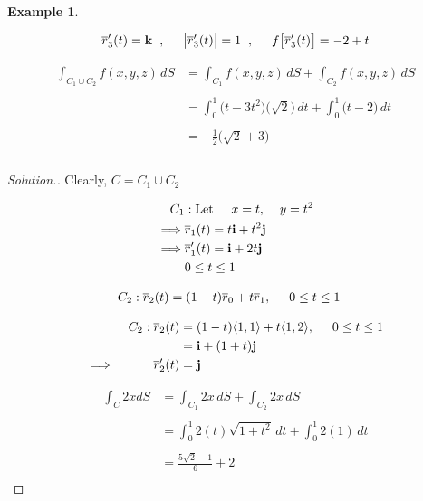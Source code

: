 \documentclass[11pt,a4paper]{article}
\theoremstyle{definition}
\newtheorem{exa}[thm]{Example}
\newenvironment{solution}
  {\renewcommand{\qedsymbol}{}\begin{proof}[\textit{Solution}.]}
  {\end{proof}}
\begin{document}
\begin{exa}
\begin{enumerate}
$$\overline{r}'_3(t) = \textbf{k}\hspace{0.2cm},\hspace{0.5cm} \begin{vmatrix}
\overline{r}'_3(t)\\
\end{vmatrix}  = 1\hspace{0.2cm},\hspace{0.5cm} f\big[\overline{r}'_3(t)\big] =-2 +t$$

\begin{align*}
\int_{C_1\cup C_2}f(x,y,z)\,dS & = \int_{C_1}f(x,y,z)\,dS + \int_{C_2}f(x,y,z)\,dS\\\\
& = \int^1_0 \big(t-3t^2\big)\big(\sqrt{2}\big)\,dt + \int^1_0 \big(t-2\big)\,dt\\\\
& = -\frac{1}{2}\big(\sqrt{2}+3\big)\\\\
\end{align*}
\end{enumerate}
\end{exa}

\begin{solution}
Clearly, $C = C_1 \cup C_2$

\begin{align*}
C_1 & : \text{Let}\hspace{0.5cm} x = t,\hspace{0.4cm} y = t^2\\
\implies & \overline{r}_1(t) = t\textbf{i} + t^2\textbf{j}\\
\implies & \overline{r}_1'(t) = \textbf{i} + 2t\textbf{j}\\
& 0\leq t \leq 1
\end{align*}

\begin{align*}
C_2 & : \overline{r}_2(t) = (1-t)\overline{r}_0 + t\overline{r}_1,\hspace{0.5cm} 0\leq t\leq 1
\end{align*}

\begin{align*}
C_2: \overline{r}_2(t) & = (1-t)\langle 1,1\rangle + t\langle 1,2\rangle, \hspace{0.5cm} 0\leq t \leq 1 \\
                       & = \textbf{i} + (1+t)\textbf{j}\\
     \implies \hspace{1cm} \overline{r}'_2(t) & = \textbf{j}
\end{align*}

\begin{align*}
\int_C 2xdS & = \int_{C_1}2x\,dS + \int_{C_2}2x\,dS\\\\
            & = \int^1_0 2(t) \sqrt{1 + t^2} \,dt + \int^1_0 2(1)\,dt\\\\
            & = \frac{5\sqrt{2}-1}{6}+2\\
\end{align*}
\end{solution}
\end{document}
